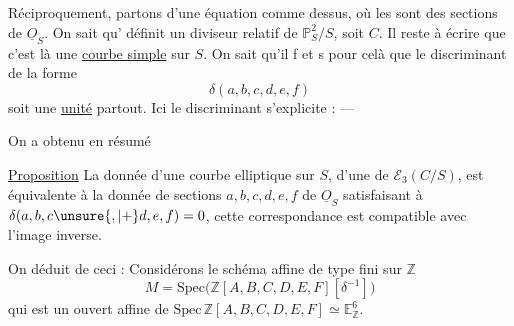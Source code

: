 Réciproquement, partons d'une équation comme dessus, où les   sont des sections de $\underline O_S$. On sait qu'  définit un diviseur relatif  de $\mathbb P^2_S/S$, soit $C$. Il reste à écrire que c'est là une \uline{courbe simple} sur $S$. On sait qu'il f et s pour celà que le discriminant de la forme
\[
\delta(a,b,c,d,e,f)
\]
soit une \uline{unité} partout. Ici le discriminant s'explicite : ---

On a obtenu en résumé

\uline{Proposition} La donnée d'une courbe elliptique sur $S$,   d'une   de $\mathcal E_3(C/S)$,  est équivalente à la donnée de sections $a,b,c,d,e,f$ de $\underline O_S$ satisfaisant à $\delta(a,b,c\unsure{,|+}d,e,f)=0$, cette correspondance est compatible avec l'image inverse.

On déduit de ceci : Considérons le schéma affine de type fini sur $\mathbb Z$
\[
M=\mathrm{Spec}\bigl(\mathbb Z[A,B,C,D,E,F][\delta^{-1}]\bigr)
\]
qui est un ouvert affine de $\mathrm{Spec}\,\mathbb Z[A,B,C,D,E,F]\simeq\mathbb E^6_{\mathbb Z}$. 

